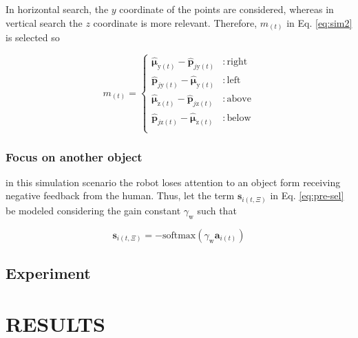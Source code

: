\documentclass[letterpaper, 10 pt, conference]{ieeeconf}  %
\begin{document}
	\noindent In horizontal search, the $y$ coordinate of the points are considered, whereas in vertical search the $z$ coordinate is more relevant. Therefore, $m_{(t)}$ in Eq. \eqref{eq:sim2} is selected so
	
	\begin{equation}
	m_{(t)} = 
	\left\{
	\begin{split}
	\boldsymbol{\hat{\mu}}_{\mathrm{y}(t)}- \mathbf{\hat{p}}_{j\mathrm{y}(t)} & : \mathrm{right}\\
	\mathbf{\hat{p}}_{j\mathrm{y}(t)} - \boldsymbol{\hat{\mu}}_{\mathrm{y}(t)}& : \mathrm{left}\\
	\boldsymbol{\hat{\mu}}_{\mathrm{z}(t)}- \mathbf{\hat{p}}_{j\mathrm{z}(t)} & : \mathrm{above}\\
	\mathbf{\hat{p}}_{j\mathrm{z}(t)} - \boldsymbol{\hat{\mu}}_{\mathrm{z}(t)} & : \mathrm{below}\\
	\end{split}\right.
	\label{eq:sim2-m}
	\end{equation}
	
	\subsubsection{Focus on another object} in this simulation scenario the robot loses attention to an object form receiving negative feedback from the human. Thus, let the term $\mathbf{s}_{i(t,\Xi)}$ in Eq. \eqref{eq:pre-sel} be modeled considering the gain constant $\gamma_\mathrm{w}$ such that
	
	\begin{equation}
	\mathbf{s}_{i(t,\Xi)} = -\mathrm{softmax}\left(\gamma_\mathrm{w}\mathbf{a}_{i(t)}\right)
	\label{eq:sim3}
	\end{equation}
	
	
	\subsection{Experiment}
	
	\section{RESULTS}
	\label{sec:results}
\end{document}

